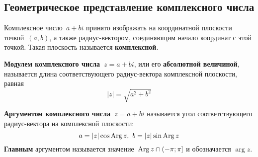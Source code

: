 \subsection{Геометрическое представление комплексного числа}
Комплексное число~$a + bi$ принято изображать на координатной плоскости точкой~$(a, b)$, а также радиус-вектором, соединяющим начало координат с этой точкой.
Такая плоскость называется \textbf{комплексной}.

\textbf{Модулем комплексного числа~$z = a + bi$}, или его \textbf{абсолютной величиной}, называется длина соответствующего радиус-вектора комплексной плоскости, равная
\begin{equation*}
|z| = \sqrt{a^2 + b^2}
\end{equation*}

\textbf{Аргументом комплексного числа~$z = a + bi$} называется угол соответствующего радиус-вектора на комплексной плоскости:
\begin{equation*}
a = |z| \cos \operatorname{Arg} z, \ b = |z| \sin \operatorname{Arg} z
\end{equation*}
\textbf{Главным} аргументом называется значение~$\operatorname{Arg} z \cap (-\pi; \pi]$ и обозначается $\arg z$.